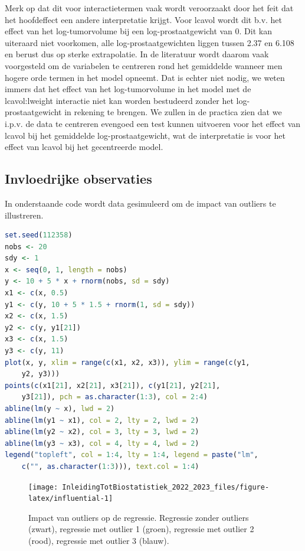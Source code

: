 \documentclass[
  12pt,dutch,coursenotes]{book}
\begin{document}
Merk op dat dit voor interactietermen vaak wordt veroorzaakt door het feit dat het hoofdeffect een andere interpretatie krijgt. Voor lcavol wordt dit b.v. het effect van het log-tumorvolume bij een log-prostaatgewicht van 0. Dit kan uiteraard niet voorkomen, alle log-prostaatgewichten liggen tussen 2.37 en 6.108 en berust dus op sterke extrapolatie. In de literatuur wordt daarom vaak voorgesteld om de variabelen te centreren rond het gemiddelde wanneer men hogere orde termen in het model opneemt. Dat is echter niet nodig, we weten immers dat het effect van het log-tumorvolume in het model met de lcavol:lweight interactie niet kan worden bestudeerd zonder het log-prostaatgewicht in rekening te brengen.
We zullen in de practica zien dat we i.p.v. de data te centreren evengoed een test kunnen uitvoeren voor het effect van lcavol bij het gemiddelde log-prostaatgewicht, wat de interpretatie is voor het effect van lcavol bij het gecentreerde model.

\hypertarget{invloedrijke-observaties}{%
\subsection{Invloedrijke observaties}\label{invloedrijke-observaties}}

In onderstaande code wordt data gesimuleerd om de impact van outliers te illustreren.

\begin{lstlisting}[language=R]
set.seed(112358)
nobs <- 20
sdy <- 1
x <- seq(0, 1, length = nobs)
y <- 10 + 5 * x + rnorm(nobs, sd = sdy)
x1 <- c(x, 0.5)
y1 <- c(y, 10 + 5 * 1.5 + rnorm(1, sd = sdy))
x2 <- c(x, 1.5)
y2 <- c(y, y1[21])
x3 <- c(x, 1.5)
y3 <- c(y, 11)
plot(x, y, xlim = range(c(x1, x2, x3)), ylim = range(c(y1,
    y2, y3)))
points(c(x1[21], x2[21], x3[21]), c(y1[21], y2[21],
    y3[21]), pch = as.character(1:3), col = 2:4)
abline(lm(y ~ x), lwd = 2)
abline(lm(y1 ~ x1), col = 2, lty = 2, lwd = 2)
abline(lm(y2 ~ x2), col = 3, lty = 3, lwd = 2)
abline(lm(y3 ~ x3), col = 4, lty = 4, lwd = 2)
legend("topleft", col = 1:4, lty = 1:4, legend = paste("lm",
    c("", as.character(1:3))), text.col = 1:4)
\end{lstlisting}

\begin{figure}

{\centering \texttt{[image: InleidingTotBiostatistiek\_2022\_2023\_files/figure-latex/influential-1]} 

}

\caption{Impact van outliers op de regressie. Regressie zonder outliers (zwart), regressie met outlier 1 (groen), regressie met outlier 2 (rood), regressie met outlier 3 (blauw).}\label{fig:influential}
\end{figure}
\end{document}
